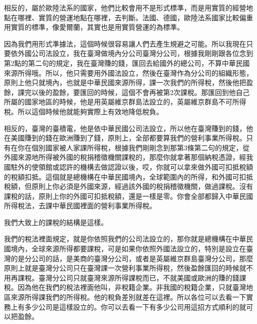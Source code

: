 \documentclass[oneside,sub3section]{ctexbook}
\begin{document}
相反的，屬於歐陸法系的國家，他們比較會用不是形式標準，而是用實質的經營地點在哪裡、實質的營運地點在哪裡，去判斷。法國、德國，歐陸法系國家比較偏重用實質的標準，像愛爾蘭，其實也是用實質營運的為標準。

因為我們用形式準據法，這個時候很容易讓人們去產生規避之可能。所以我現在只要依外國公司法設立，我在臺灣做境內分公司臺灣分公司，根據我剛剛跟各位念到第2點的第二句的規定，我在臺灣賺的錢，匯回去給國外的總公司，不算中華民國來源所得哦。所以，他只需要用外國法設立，然後在臺灣作為分公司的組織形態，原則上他只就境內，也就是中華民國來源所得，課一次我們的所得稅，然後他把盈餘，課完以後的盈餘，要匯回的時候，這個不會再被第2次課稅。那匯回到他自己所屬的國家地區的時候，他是用英屬維京群島法設立的，英屬維京群島不可所得稅。所以這個時候他就能夠實際上有效地降低稅負。

相反的，臺灣的臺積電，他是依中華民國公司法設立，所以他在臺灣賺到的錢，他在美國賺到的錢在歐洲賺到了錢，原則上，全部都要算我們的營利事業所得稅。只有在你在個別國家被人家課所得稅，根據我們剛剛念到那第3條第二句的規定，從外國來源地所得被外國的稅捐稽徵機關課稅的，那麼你就拿著那個納稅憑證，經我國駐外的使領館或認許的機構去做認證以後，哎，你就可以拿來做外國可扣抵稅額的稅額扣抵。這個就是總機構在中華民國境內，全球範圍內的所得，和外國可扣抵稅額，但原則上你必須是外國來源，經過該外國的稅捐稽徵機關，做過課稅。沒有課稅的話，原則上你的外國可扣抵稅額，還是一樣是零。你會全部都歸入中華民國所得稅法，去課中華民國裡面的營利事業所得稅。

我們大致上的課稅的結構是這樣。

我們的稅法裡面規定，就是你依照我們的公司法設立的，那你就是總機構在中華民國境內，全球來源所得都要課稅，可是如果你依照外國法設立的，特別是設立在臺灣的是分公司的話，是美商的臺灣分公司，或者是英屬維京群島臺灣分公司，那麼原則上就是臺灣分公司只在臺灣課一次營利事業所得稅，然後盈餘匯回的時候就不用再課稅。臺灣分公司只就臺灣來源所得課稅而已，不就美國或歐洲的賺的錢課稅。因為他在我們的稅法裡面他叫，非稅籍企業。非我國的稅籍企業，只就臺灣地區來源所得課我們的所得稅。他的稅負差別就差在這裡。所以各位可以去看一下實務上有多少公司是這樣設立的。你可以去看一下有多少公司用這招方式順利的就可以把盈餘。
\end{document}
